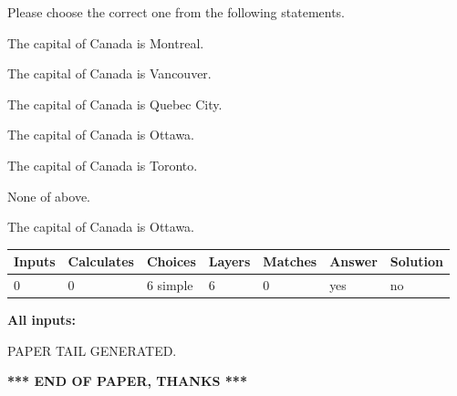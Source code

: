 \documentclass[12pt]{article}
\begin{document}
  
Please choose the correct one from the following statements.
 
 
The capital of Canada is Montreal.
 
 
The capital of Canada is Vancouver.
 
 
The capital of Canada is Quebec City.
 
 
The capital of Canada is Ottawa.
 
 
The capital of Canada is Toronto.
 
 
 None of above.
 
 
\noindent{}
 
 
The capital of Canada is Ottawa.
 
 
\noindent{}
 
 
   
   
   
   
\noindent\begin{tabular}{|l|l|l|l|l|l|l|}
 \hline
Inputs & Calculates & Choices & Layers & Matches & Answer & Solution \\ \hline
 0  & 
 0  & 
 6
  simple  
  & 
 6  & 
 0  & 
  yes & 
  no 
  \\ \hline
 \end{tabular}
   
   
   
   
\noindent{}
   
   
   
   
\noindent\vspace{0.1in}\hspace{-0.08in} {\textbf{\Large{All inputs: }}}
   
   
   
   
   
   
 \vspace{0.2in}
 
   
   
\vspace{2.0in} PAPER TAIL GENERATED.
   
   
   
   
\vspace{1.0in} 
{\textbf{\large{ *** END OF PAPER, THANKS *** }}} 
   
\end{document}
